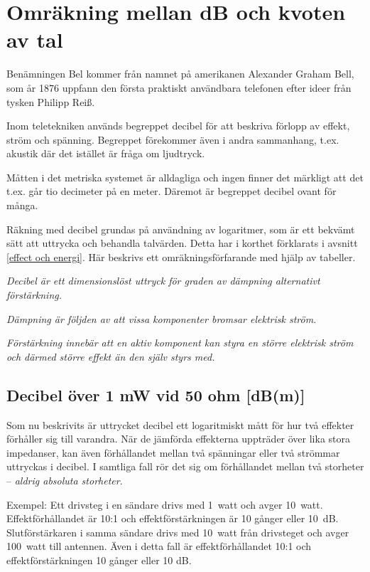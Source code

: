 \chapter{Omräkning mellan dB och kvoten av tal}
\label{decibel}

Benämningen Bel kommer från namnet på amerikanen Alexander Graham
Bell, som år 1876 uppfann den första praktiskt användbara telefonen
efter ideer från tysken Philipp Reiß.

Inom teletekniken används begreppet decibel för att beskriva förlopp
av effekt, ström och spänning. Begreppet förekommer även i andra
sammanhang, t.ex. akustik där det istället är fråga om ljudtryck.

Måtten i det metriska systemet är alldagliga och ingen finner det
märkligt att det t.ex. går tio decimeter på en meter. Däremot är
begreppet decibel ovant för många.

Räkning med decibel grundas på användning av logaritmer, som är ett
bekvämt sätt att uttrycka och behandla talvärden. Detta har i
korthet förklarats i avsnitt \ref{effect och energi}. Här beskrivs ett
omräkningsförfarande med hjälp av tabeller.

\emph{Decibel är ett dimensionslöst uttryck för graden av dämpning
  alternativt förstärkning.}

\emph{Dämpning är följden av att vissa komponenter bromsar elektrisk
  ström.}

\emph{Förstärkning innebär att en aktiv komponent kan styra en större
  elektrisk ström och därmed större effekt än den själv styrs med.}

\section{Decibel över 1 mW vid 50 ohm [dB(m)]}

Som nu beskrivits är uttrycket decibel ett logaritmiskt mått för hur
två effekter förhåller sig till varandra. När de jämförda effekterna
uppträder över lika stora impedanser, kan även förhållandet mellan två
spänningar eller två strömmar uttryckas i decibel.
I samtliga fall rör det sig om förhållandet mellan två storheter --
\emph{aldrig absoluta storheter}.

Exempel: Ett drivsteg i en sändare drivs med 1~watt och avger 10~watt.
Effektförhållandet är 10:1 och effektförstärkningen är 10 gånger
eller 10~dB. Slutförstärkaren i samma sändare drivs med 10~watt från
drivsteget och avger 100~watt till antennen. Även i detta fall är
effektförhållandet 10:1 och effektförstärkningen 10 gånger eller 10
dB.


